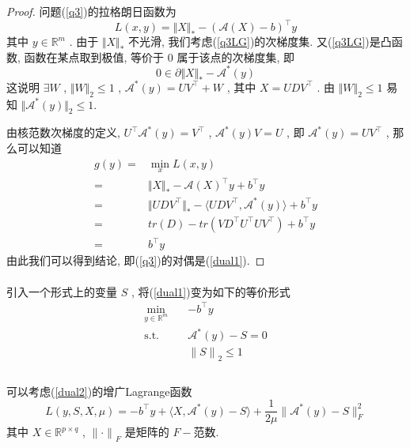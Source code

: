 \documentclass[a4paper, UTF8]{ctexart}				%
\numberwithin{equation}{section}				%
\begin{document}
			\begin{proof}
				问题(\ref{q3})的拉格朗日函数为 
				\begin{equation}\label{q3LG}
					L(x, y) = \Vert{X}\Vert_* - (\mathcal{A}(X) - b)^\top y
				\end{equation}
				其中 $y \in \mathbb{R}^m$ . 由于 $\Vert{X}\Vert_*$ 不光滑, 我们考虑(\ref{q3LG})的次梯度集. 又(\ref{q3LG})是凸函数, 函数在某点取到极值, 等价于 $0$ 属于该点的次梯度集, 即 
				\[
					0 \in \partial \Vert{X}\Vert_* - \mathcal{A}^*(y)
				\]
				这说明 $\exists W$ , $\Vert{W}\Vert_2 \le 1$ , $\mathcal{A}^*(y) = U V ^\top + W$ , 其中 $X = U D V ^\top$ . 由 $\Vert{W}\Vert_2 \le 1$ 易知 $\Vert{\mathcal{A}^*(y)}\Vert_2 \le 1$.
				
				由核范数次梯度的定义, $U ^\top \mathcal{A}^*(y) = V ^\top$ , $\mathcal{A}^*(y) V = U$ , 即 $\mathcal{A}^*(y) = U V ^\top$ , 那么可以知道
				\begin{equation}
					\begin{split}
							g(y)
						=	& \min_x L(x, y)\\
						=	& \Vert{X}\Vert_* - \mathcal{A}(X)^\top y + b ^\top y\\
						=	& \Vert{U D V ^\top}\Vert_* - \langle{U D V ^\top},{\mathcal{A}^*(y)}\rangle + b ^\top y \\
						=	& tr(D) - tr(V D ^\top U ^\top U V ^\top) + b ^\top y \\
						=	& b ^\top y 
					\end{split}
				\end{equation}
				由此我们可以得到结论, 即(\ref{q3})的对偶是(\ref{dual1}).
			\end{proof}
				
			\paragraph{}
				\quad 引入一个形式上的变量 $S$ , 将(\ref{dual1})变为如下的等价形式
				\begin{equation}
					\begin{split}\label{dual2}
						\min_{y \in \mathbb{R}^{m}} \quad
							& -b^\top y\\
						\text{s.t.} \quad
							& \mathcal{A}^*(y) - S = 0\\
							& {\lVert{S}\rVert}_2 \le 1\\
					\end{split}
				\end{equation}

			\paragraph{}
				\quad 可以考虑(\ref{dual2})的增广Lagrange函数
				\begin{equation}\label{Lag}
						L(y, S, X, \mu)
					=	-b^\top y + \langle{X, \mathcal{A}^*(y) - S}\rangle + \frac{1}{2\mu} \lVert{\mathcal{A}^*(y) - S}\rVert^2_F
				\end{equation}
				其中 $X \in \mathbb{R}^{p \times q}$ , ${\lVert{\cdot}\rVert}_F$ 是矩阵的 $F-$范数.
\end{document}
